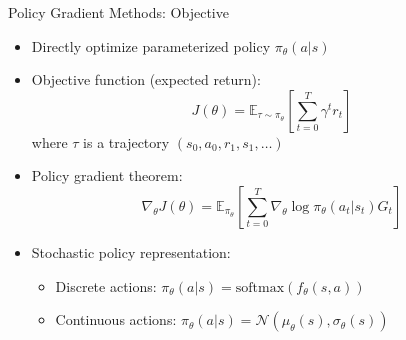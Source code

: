 \documentclass[10pt]{beamer}
\newcommand{\E}{\mathbb{E}}
\begin{document}
\begin{frame}{Policy Gradient Methods: Objective}
    \begin{itemize}
        \item Directly optimize parameterized policy $\pi_\theta(a|s)$
        \vspace{0.2cm}
        \item Objective function (expected return):
        \begin{equation}
            J(\theta) = \E_{\tau \sim \pi_\theta} \left[ \sum_{t=0}^{T} \gamma^t r_t \right]
        \end{equation}
        where $\tau$ is a trajectory $(s_0, a_0, r_1, s_1, \ldots)$
        \vspace{0.2cm}
        \item Policy gradient theorem:
        \begin{equation}
            \nabla_\theta J(\theta) = \E_{\pi_\theta} \left[ \sum_{t=0}^{T} \nabla_\theta \log \pi_\theta(a_t|s_t) G_t \right]
        \end{equation}
        \vspace{0.2cm}
        \item Stochastic policy representation:
        \begin{itemize}
            \item Discrete actions: $\pi_\theta(a|s) = \text{softmax}(f_\theta(s,a))$
            \item Continuous actions: $\pi_\theta(a|s) = \mathcal{N}(\mu_\theta(s), \sigma_\theta(s))$
        \end{itemize}
    \end{itemize}
\end{frame}

\end{document}
